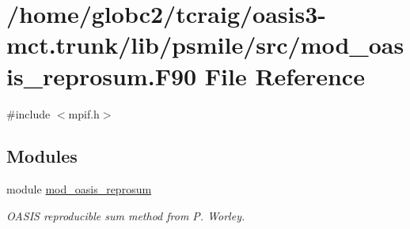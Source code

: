 \hypertarget{mod__oasis__reprosum_8_f90}{}\section{/home/globc2/tcraig/oasis3-\/mct.trunk/lib/psmile/src/mod\+\_\+oasis\+\_\+reprosum.F90 File Reference}
\label{mod__oasis__reprosum_8_f90}
{\ttfamily \#include $<$mpif.\+h$>$}\newline
\subsection*{Modules}
\begin{DoxyCompactItemize}
\item 
module \hyperlink{namespacemod__oasis__reprosum}{mod\+\_\+oasis\+\_\+reprosum}
\begin{DoxyCompactList}\small\item\em O\+A\+S\+IS reproducible sum method from P. Worley. \end{DoxyCompactList}\end{DoxyCompactItemize}
